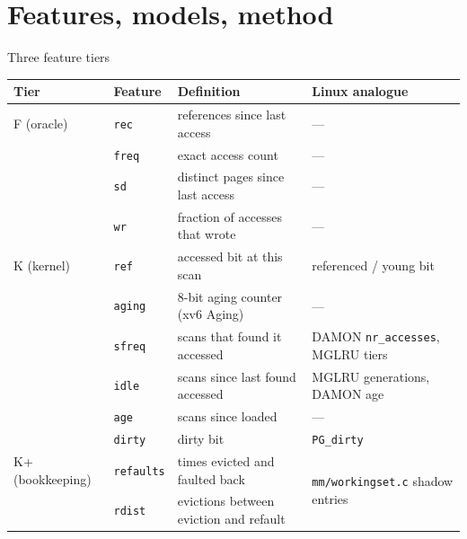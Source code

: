 \documentclass[10pt,aspectratio=169]{beamer}
\newcommand{\good}[1]{\textcolor{good}{#1}}
\newcommand{\warn}[1]{\textcolor{warn}{#1}}
\begin{document}
\section{Features, models, method}

\begin{frame}{Three feature tiers}
  \scriptsize
  \begin{tabular}{llp{5.3cm}p{3.4cm}}
    \toprule
    Tier & Feature & Definition & Linux analogue \\
    \midrule
    \warn{F (oracle)} & \texttt{rec} & references since last access & --- \\
     & \texttt{freq} & exact access count & --- \\
     & \texttt{sd} & distinct pages since last access & --- \\
     & \texttt{wr} & fraction of accesses that wrote & --- \\
    \midrule
    \textcolor{accent}{K (kernel)} & \texttt{ref} & accessed bit at this scan & referenced / young bit \\
     & \texttt{aging} & 8-bit aging counter (xv6 Aging) & --- \\
     & \texttt{sfreq} & scans that found it accessed & DAMON \texttt{nr\_accesses}, MGLRU tiers \\
     & \texttt{idle} & scans since last found accessed & MGLRU generations, DAMON age \\
     & \texttt{age} & scans since loaded & --- \\
     & \texttt{dirty} & dirty bit & \texttt{PG\_dirty} \\
    \midrule
    \good{K+ (bookkeeping)} & \texttt{refaults} & times evicted and faulted back & \multirow{2}{*}{\texttt{mm/workingset.c} shadow entries} \\
     & \texttt{rdist} & evictions between eviction and refault & \\
    \bottomrule
  \end{tabular}
\end{frame}
\end{document}

